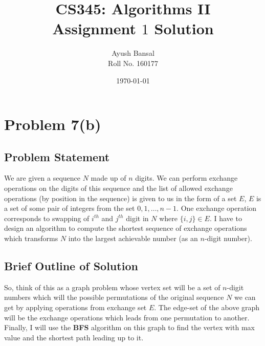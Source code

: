 \documentclass{article}
\title{\vspace{80mm}\lightgreyb CS345: Algorithms II \\
\lightgreyb Assignment $1$ Solution}
\author{Ayush Bansal \\
Roll No. 160177}
\date{\today}
\let\bold\textbf
\begin{document}
\clearpage\maketitle
\thispagestyle{empty}
\newpage
\setcounter{page}{1}
\section{Problem 7(b)}{
  \subsection{Problem Statement}{
    We are given a sequence $N$ made up of $n$ digits. We can perform exchange operations on the digits of this sequence and the list of allowed exchange operations (by position in the sequence) is given to us in the form of a set $E$, $E$ is a set of some pair of integers from the set $0,1,\dots,n-1$. One exchange operation corresponds to swapping of $i^{th}$ and $j^{th}$ digit in $N$ where $\{i,j\} \in E$. \newline
    I have to design an algorithm to compute the shortest sequence of exchange operations which transforms $N$ into the largest achievable number (as an $n$-digit number).
  }
  \subsection{Brief Outline of Solution}{
    So, think of this as a graph problem whose vertex set will be a set of $n$-digit numbers which will the possible permutations of the original sequence $N$ we can get by applying operations from exchange set $E$.
    The edge-set of the above graph will be the exchange operations which leads from one permutation to another. \newline
		Finally, I will use the \bold{BFS} algorithm on this graph to find the vertex with max value and the shortest path leading up to it.
  }
}
\end{document}
